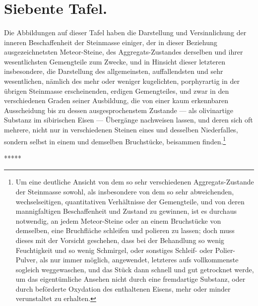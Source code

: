 \documentclass[a4paper, 11pt, oneside, german]{article}
\begin{document}
\section{Siebente Tafel.}
\paragraph{}
Die Abbildungen auf dieser Tafel haben die Darstellung und Versinnlichung der inneren Beschaffenheit der Steinmasse einiger, der in dieser Beziehung ausgezeichnetsten Meteor-Steine, des Aggregats-Zustandes derselben und ihrer wesentlichsten Gemengteile zum Zwecke, und in Hinsicht dieser letzteren insbesondere, die Darstellung des allgemeinsten, auffallendsten und sehr wesentlichen, nämlich des mehr oder weniger kugelichten, porphyrartig in der übrigen Steinmasse erscheinenden, erdigen Gemengteiles, und zwar in den verschiedenen Graden seiner Ausbildung, die von einer kaum erkennbaren Ausscheidung bis zu dessen ausgesprochenstem Zustande --- als olivinartige Substanz im sibirischen Eisen --- Übergänge nachweisen lassen, und deren sich oft mehrere, nicht nur in verschiedenen Steinen eines und desselben Niederfalles, sondern selbst in einem und demselben Bruchstücke, beisammen finden.\footnote{Um eine deutliche Ansicht von dem so sehr verschiedenen Aggregats-Zustande der Steinmasse sowohl, als insbesondere von dem so sehr abweichenden, wechselseitigen, quantitativen Verhältnisse der Gemengteile, und von deren mannigfaltigen Beschaffenheit und Zustand zu gewinnen, ist es durchaus notwendig, an jedem Meteor-Steine oder an einem Bruchstücke von demselben, eine Bruchfläche schleifen und polieren zu lassen; doch muss dieses mit der Vorsicht geschehen, dass bei der Behandlung so wenig Feuchtigkeit und so wenig Schmirgel, oder sonstiges Schleif- oder Polier-Pulver, als nur immer möglich, angewendet, letzteres aufs vollkommenste sogleich weggewaschen, und das Stück dann schnell und gut getrocknet werde, um das eigentümliche Ansehen nicht durch eine fremdartige Substanz, oder durch beförderte Oxydation des enthaltenen Eisens, mehr oder minder verunstaltet zu erhalten.}

\centerline{*\hspace{15mm}*\hspace{15mm}*\hspace{15mm}*\hspace{15mm}*}
\bigskip
\end{document}
